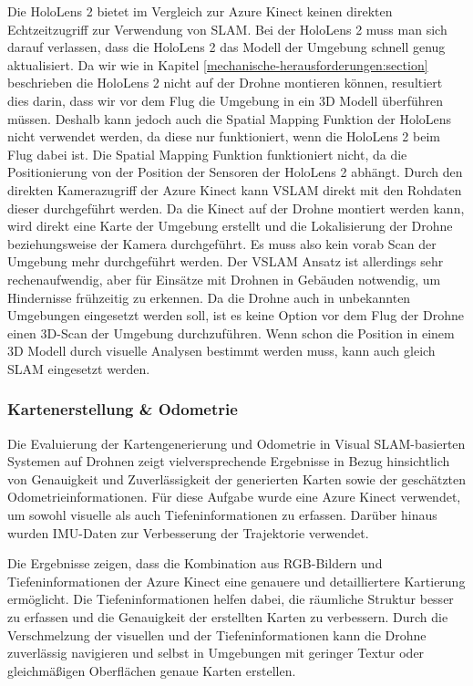 Die HoloLens 2 bietet im Vergleich zur Azure Kinect keinen direkten Echtzeitzugriff zur Verwendung von \ac{SLAM}. Bei der HoloLens 2 muss man sich darauf verlassen, dass die HoloLens 2 das Modell der Umgebung schnell genug aktualisiert. Da wir wie in Kapitel \ref{mechanische-herausforderungen:section} beschrieben die HoloLens 2 nicht auf der Drohne montieren können, resultiert dies darin, dass wir vor dem Flug die Umgebung in ein 3D Modell überführen müssen. Deshalb kann jedoch auch die Spatial Mapping Funktion der HoloLens nicht verwendet werden, da diese nur funktioniert, wenn die HoloLens 2 beim Flug dabei ist.
Die Spatial Mapping Funktion funktioniert nicht, da die Positionierung von der Position der Sensoren der HoloLens 2 abhängt.
Durch den direkten Kamerazugriff der Azure Kinect kann \ac{VSLAM} direkt mit den Rohdaten dieser durchgeführt werden. Da die Kinect auf der Drohne montiert werden kann, wird direkt eine Karte der Umgebung erstellt und die Lokalisierung der Drohne beziehungsweise der Kamera durchgeführt. Es muss also kein vorab Scan der Umgebung mehr durchgeführt werden. Der \ac{VSLAM} Ansatz ist allerdings sehr rechenaufwendig, aber für Einsätze mit Drohnen in Gebäuden notwendig, um Hindernisse frühzeitig zu erkennen. Da die Drohne auch in unbekannten Umgebungen eingesetzt werden soll, ist es keine Option vor dem Flug der Drohne einen 3D-Scan der Umgebung durchzuführen. Wenn schon die Position in einem 3D Modell durch visuelle Analysen bestimmt werden muss, kann auch gleich \ac{SLAM} eingesetzt werden.

\subsubsection{Kartenerstellung \& Odometrie}

Die Evaluierung der Kartengenerierung und Odometrie in Visual SLAM-basierten Systemen auf Drohnen zeigt vielversprechende Ergebnisse in Bezug hinsichtlich von Genauigkeit und Zuverlässigkeit der generierten Karten sowie der geschätzten Odometrieinformationen. Für diese Aufgabe wurde eine Azure Kinect verwendet, um sowohl visuelle als auch Tiefeninformationen zu erfassen. Darüber hinaus wurden \ac{IMU}-Daten zur Verbesserung der Trajektorie verwendet.

Die Ergebnisse zeigen, dass die Kombination aus RGB-Bildern und Tiefeninformationen der Azure Kinect eine genauere und detailliertere Kartierung ermöglicht. Die Tiefeninformationen helfen dabei, die räumliche Struktur besser zu erfassen und die Genauigkeit der erstellten Karten zu verbessern. Durch die Verschmelzung der visuellen und der Tiefeninformationen kann die Drohne zuverlässig navigieren und selbst in Umgebungen mit geringer Textur oder gleichmäßigen Oberflächen genaue Karten erstellen.

